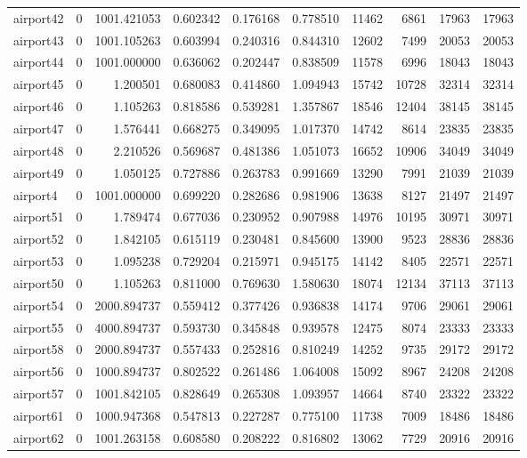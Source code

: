 \begin{longtable}{|l|r|r|r|r|r|r|r|r|r|}
airport42 & 0 & 1001.421053 & 0.602342 & 0.176168 & 0.778510 & 11462 & 6861 & 17963 & 17963 \\
airport43 & 0 & 1001.105263 & 0.603994 & 0.240316 & 0.844310 & 12602 & 7499 & 20053 & 20053 \\
airport44 & 0 & 1001.000000 & 0.636062 & 0.202447 & 0.838509 & 11578 & 6996 & 18043 & 18043 \\
airport45 & 0 & 1.200501 & 0.680083 & 0.414860 & 1.094943 & 15742 & 10728 & 32314 & 32314 \\
airport46 & 0 & 1.105263 & 0.818586 & 0.539281 & 1.357867 & 18546 & 12404 & 38145 & 38145 \\
airport47 & 0 & 1.576441 & 0.668275 & 0.349095 & 1.017370 & 14742 & 8614 & 23835 & 23835 \\
airport48 & 0 & 2.210526 & 0.569687 & 0.481386 & 1.051073 & 16652 & 10906 & 34049 & 34049 \\
airport49 & 0 & 1.050125 & 0.727886 & 0.263783 & 0.991669 & 13290 & 7991 & 21039 & 21039 \\
airport4 & 0 & 1001.000000 & 0.699220 & 0.282686 & 0.981906 & 13638 & 8127 & 21497 & 21497 \\
airport51 & 0 & 1.789474 & 0.677036 & 0.230952 & 0.907988 & 14976 & 10195 & 30971 & 30971 \\
airport52 & 0 & 1.842105 & 0.615119 & 0.230481 & 0.845600 & 13900 & 9523 & 28836 & 28836 \\
airport53 & 0 & 1.095238 & 0.729204 & 0.215971 & 0.945175 & 14142 & 8405 & 22571 & 22571 \\
airport50 & 0 & 1.105263 & 0.811000 & 0.769630 & 1.580630 & 18074 & 12134 & 37113 & 37113 \\
airport54 & 0 & 2000.894737 & 0.559412 & 0.377426 & 0.936838 & 14174 & 9706 & 29061 & 29061 \\
airport55 & 0 & 4000.894737 & 0.593730 & 0.345848 & 0.939578 & 12475 & 8074 & 23333 & 23333 \\
airport58 & 0 & 2000.894737 & 0.557433 & 0.252816 & 0.810249 & 14252 & 9735 & 29172 & 29172 \\
airport56 & 0 & 1000.894737 & 0.802522 & 0.261486 & 1.064008 & 15092 & 8967 & 24208 & 24208 \\
airport57 & 0 & 1001.842105 & 0.828649 & 0.265308 & 1.093957 & 14664 & 8740 & 23322 & 23322 \\
airport61 & 0 & 1000.947368 & 0.547813 & 0.227287 & 0.775100 & 11738 & 7009 & 18486 & 18486 \\
airport62 & 0 & 1001.263158 & 0.608580 & 0.208222 & 0.816802 & 13062 & 7729 & 20916 & 20916 \\

\end{longtable}
